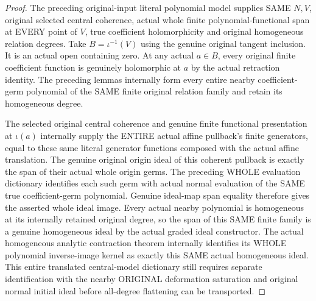 \begin{proof}
The preceding original-input literal polynomial model supplies SAME $N,V$, original selected central coherence, actual whole finite polynomial-functional span at EVERY point of $V$, true coefficient holomorphicity and original homogeneous relation degrees. Take $B=\iota^{-1}(V)$ using the genuine original tangent inclusion. It is an actual open containing zero. At any actual $a\in B$, every original finite coefficient function is genuinely holomorphic at $a$ by the actual retraction identity. The preceding lemmas internally form every entire nearby coefficient-germ polynomial of the SAME finite original relation family and retain its homogeneous degree.

The selected original central coherence and genuine finite functional presentation at $\iota(a)$ internally supply the ENTIRE actual affine pullback's finite generators, equal to these same literal generator functions composed with the actual affine translation. The genuine original origin ideal of this coherent pullback is exactly the span of their actual whole origin germs. The preceding WHOLE evaluation dictionary identifies each such germ with actual normal evaluation of the SAME true coefficient-germ polynomial. Genuine ideal-map span equality therefore gives the asserted whole ideal image. Every actual nearby polynomial is homogeneous at its internally retained original degree, so the span of this SAME finite family is a genuine homogeneous ideal by the actual graded ideal constructor. The actual homogeneous analytic contraction theorem internally identifies its WHOLE polynomial inverse-image kernel as exactly this SAME actual homogeneous ideal. This entire translated central-model dictionary still requires separate identification with the nearby ORIGINAL deformation saturation and original normal initial ideal before all-degree flattening can be transported.
\end{proof}
